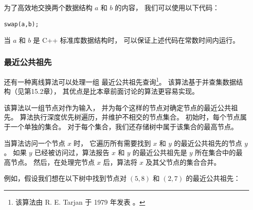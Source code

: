 为了高效地交换两个数据结构 $a$ 和 $b$ 的内容，
我们可以使用以下代码：
\begin{lstlisting}
swap(a,b);
\end{lstlisting}
当 $a$ 和 $b$ 是 C++ 标准库数据结构时，
可以保证上述代码在常数时间内运行。

\subsubsection{最近公共祖先}

还有一种离线算法可以处理一组
最近公共祖先查询\footnote{该算法由 R. E. Tarjan 于 1979 年发表 \cite{tar79}。}。
该算法基于并查集数据结构（见第15.2章），
其优点是比本章前面讨论的算法更容易实现。

该算法以一组节点对作为输入，
并为每个这样的节点对确定节点的最近公共祖先。
算法执行深度优先树遍历，并维护不相交的节点集合。
初始时，每个节点属于一个单独的集合。
对于每个集合，我们还存储树中属于该集合的最高节点。

当算法访问一个节点 $x$ 时，
它遍历所有需要找到 $x$ 和 $y$ 的最近公共祖先的节点 $y$。
如果 $y$ 已经被访问过，算法报告 $x$ 和 $y$ 的最近公共祖先是 $y$ 所在集合中的最高节点。
然后，在处理完节点 $x$ 后，算法将 $x$ 及其父节点的集合合并。

例如，假设我们想在以下树中找到节点对 $(5,8)$
和 $(2,7)$ 的最近公共祖先：
\begin{center}
\end{center}

